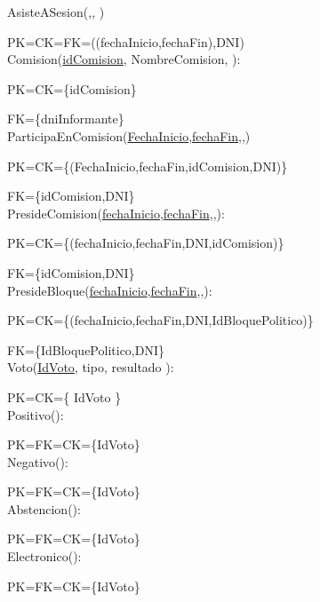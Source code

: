 AsisteASesion(\underline{},\underline{}, \underline{})

PK=CK=FK=((fechaInicio,fechaFin),DNI)\\

Comision(\underline{idComision}, NombreComision, ):

PK=CK={\{idComision}\}

FK={\{dniInformante}\} \\

ParticipaEnComision(\underline{FechaInicio},\underline{fechaFin},\underline{},\underline{})

PK=CK={\{(FechaInicio,fechaFin,idComision,DNI)}\}

FK={\{idComision,DNI}\}\\

PresideComision(\underline{fechaInicio},\underline{fechaFin},\underline{},\underline{}):

PK=CK={\{(fechaInicio,fechaFin,DNI,idComision)}\}

FK={\{idComision,DNI}\}\\

PresideBloque(\underline{fechaInicio},\underline{fechaFin},\underline{},\underline{}):

PK=CK={\{(fechaInicio,fechaFin,DNI,IdBloquePolitico)}\}

FK={\{IdBloquePolitico,DNI}\}\\

Voto(\underline{IdVoto}, tipo, resultado ):

PK=CK={\{ IdVoto }\} \\

Positivo(\underline{}):

PK=FK=CK={\{IdVoto}\}\\

Negativo(\underline{}):

PK=FK=CK={\{IdVoto}\}\\

Abstencion(\underline{}):

PK=FK=CK={\{IdVoto}\}\\

Electronico(\underline{}):

PK=FK=CK={\{IdVoto}\}\\

